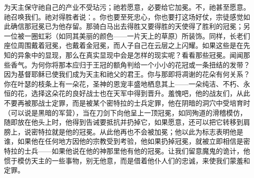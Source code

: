 为天主保守祂自己的产业不受玷污；祂若愿意，必要给它加冕。不，祂甚至愿意。祂召唤我们。祂对得胜者说：。你也要至死忠心，你也要打这场好仗，宗徒感觉如此确信那冠冕已为他存留。那骑白马出去得胜又要得胜的天使得了胜利的冠冕；另一位被一圈虹彩（如同其美丽的颜色——一片天上的草原）所装饰。同样，长老们座位周围戴着冠冕，也戴着金冠冕，而人子自己在云层之上闪耀。如果这些是在先知的异象中的显现，那么在真实显现中会是怎样的现实呢？看看那些冠冕。闻闻那些香气。为何你将那本应归于王冠的额角判给一个小小的花冠或一条扭结的发带？因为基督耶稣已使我们成为天主和祂父的君王。你与那即将凋谢的花朵有何关系？你在叶瑟的枝条上有一朵花，圣神的恩宠丰盛地栖息其上——一朵纯洁、不朽、永恒的花，选择这朵花的良好战士也在天军中得到晋升。羞愧吧，他的战友们，从此不要再被那战士定罪，而是被某个密特拉的士兵定罪，他在阴暗的洞穴中受培育时（可以说是黑暗的军营），当在刀剑下向他呈上一顶冠冕，如同殉道的滑稽模仿，随即放在他头上时，他得到告诫要抵抗并扔掉它，如果愿意，还可以把它转移到肩膀上，说密特拉就是他的冠冕。从此他再也不会被加冕；他以此为标志表明他是谁，如果他在任何地方因他的宗教受到考验，他如果扔掉冠冕，就被立即相信是密特拉的士兵——如果他说在他的神那里他有他的冠冕。让我们留意魔鬼的诡计，他惯于模仿天主的一些事物，别无他意，而是借着他仆人们的忠诚，来使我们蒙羞和定罪。\par

